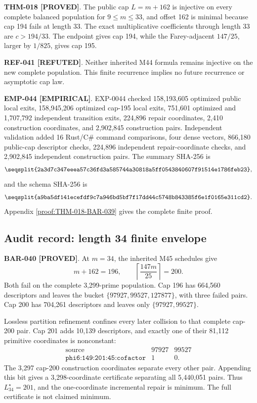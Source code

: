 \documentclass[11pt]{article}
\newcommand{\claimstatus}[2]{\textbf{#1 [#2]}}
\begin{document}
\claimstatus{THM-018}{PROVED}. The public cap \(L=m+162\) is injective on
every complete balanced population for \(9\le m\le33\), and offset 162 is
minimal because cap 194 fails at length 33. The exact multiplicative
coefficients through length 33 are \(c>194/33\). The endpoint gives cap 194,
while the Farey-adjacent \(147/25\), larger by \(1/825\), gives cap 195.

\claimstatus{REF-041}{REFUTED}. Neither inherited M44 formula remains
injective on the new complete population. This finite recurrence implies no
future recurrence or asymptotic cap law.

\claimstatus{EMP-044}{EMPIRICAL}. EXP-0044 checked 158,193,605 optimized
public local exits, 158,945,206 optimized cap-195 local exits, 751,601
optimized and 1,707,792 independent transition exits, 224,896 repair
coordinates, 2,410 construction coordinates, and 2,902,845 construction
pairs. Independent validation added 16 Rust/C\# command comparisons, four
dense vectors, 866,180 public-cap descriptor checks, 224,896 independent
repair-coordinate checks, and 2,902,845 independent construction pairs. The
summary SHA-256 is
\[
\texttt{\seqsplit{2a3d7c347eeea57c36fd3a585744a30818a5ff0543840607f91514e1786feb23}},
\]
and the schema SHA-256 is
\[
\texttt{\seqsplit{a9ba5df141ecefdf9c7a946bd5bf7f17dd44c5748b843385f6e1f0165e311cd2}}.
\]
Appendix \ref{proof:THM-018-BAR-039} gives the complete finite proof.

\subsection{Audit record: length 34 finite envelope}

\claimstatus{BAR-040}{PROVED}. At \(m=34\), the inherited M45 schedules give
\[
m+162=196,\qquad
\left\lceil\frac{147m}{25}\right\rceil=200.
\]
Both fail on the complete 3,299-prime population. Cap 196 has 664,560
descriptors and leaves the bucket
\(\{97927,99527,127877\}\), with three failed pairs. Cap 200 has 704,261
descriptors and leaves only \(\{97927,99527\}\).

Lossless partition refinement confines every later collision to that complete
cap-200 pair. Cap 201 adds 10,139 descriptors, and exactly one of their
81,112 primitive coordinates is nonconstant:
\[
\begin{array}{c|rr}
\text{source}&97927&99527\\
\hline
\texttt{phi6:149:201:45:cofactor}&1&0.
\end{array}
\]
The 3,297 cap-200 construction coordinates separate every other pair.
Appending this bit gives a 3,298-coordinate certificate separating all
5,440,051 pairs. Thus \(L_{34}^{\star}=201\), and the one-coordinate
incremental repair is minimum. The full certificate is not claimed minimum.
\end{document}
